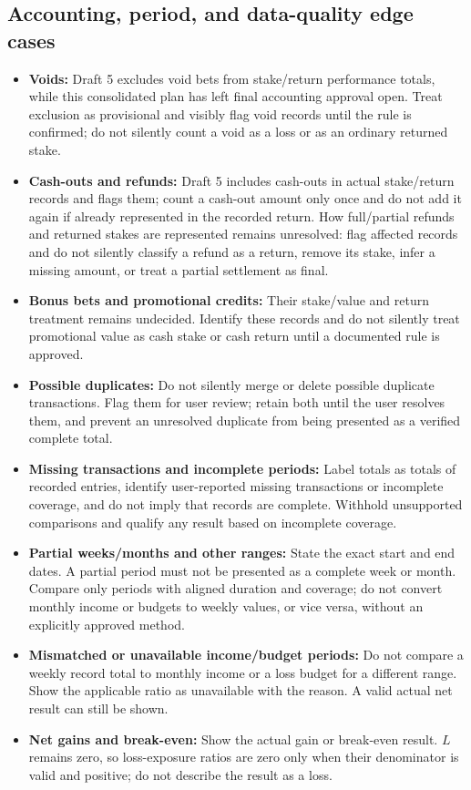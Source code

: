 \documentclass[11pt,a4paper]{article}
\begin{document}
\subsection{Accounting, period, and data-quality edge cases}
\begin{itemize}
  \item \textbf{Voids:} Draft 5 excludes void bets from stake/return performance totals, while this consolidated plan has left final accounting approval open. Treat exclusion as provisional and visibly flag void records until the rule is confirmed; do not silently count a void as a loss or as an ordinary returned stake.
  \item \textbf{Cash-outs and refunds:} Draft 5 includes cash-outs in actual stake/return records and flags them; count a cash-out amount only once and do not add it again if already represented in the recorded return. How full/partial refunds and returned stakes are represented remains unresolved: flag affected records and do not silently classify a refund as a return, remove its stake, infer a missing amount, or treat a partial settlement as final.
  \item \textbf{Bonus bets and promotional credits:} Their stake/value and return treatment remains undecided. Identify these records and do not silently treat promotional value as cash stake or cash return until a documented rule is approved.
  \item \textbf{Possible duplicates:} Do not silently merge or delete possible duplicate transactions. Flag them for user review; retain both until the user resolves them, and prevent an unresolved duplicate from being presented as a verified complete total.
  \item \textbf{Missing transactions and incomplete periods:} Label totals as totals of recorded entries, identify user-reported missing transactions or incomplete coverage, and do not imply that records are complete. Withhold unsupported comparisons and qualify any result based on incomplete coverage.
  \item \textbf{Partial weeks/months and other ranges:} State the exact start and end dates. A partial period must not be presented as a complete week or month. Compare only periods with aligned duration and coverage; do not convert monthly income or budgets to weekly values, or vice versa, without an explicitly approved method.
  \item \textbf{Mismatched or unavailable income/budget periods:} Do not compare a weekly record total to monthly income or a loss budget for a different range. Show the applicable ratio as unavailable with the reason. A valid actual net result can still be shown.
  \item \textbf{Net gains and break-even:} Show the actual gain or break-even result. \(L\) remains zero, so loss-exposure ratios are zero only when their denominator is valid and positive; do not describe the result as a loss.
\end{itemize}
\end{document}
